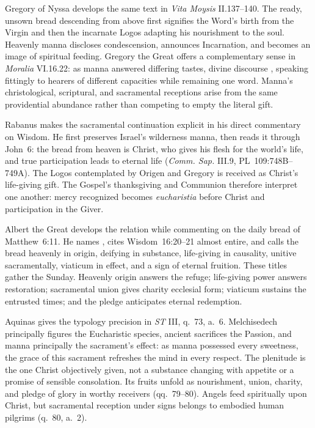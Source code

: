 Gregory of Nyssa develops the same text in \emph{Vita Moysis} II.137--140. The
ready, unsown bread descending from above first signifies the Word's birth from
the Virgin and then the incarnate Logos adapting his nourishment to the soul.
Heavenly manna discloses condescension, announces Incarnation, and becomes an
image of spiritual feeding. Gregory the Great offers a complementary sense in
\emph{Moralia} VI.16.22: as manna answered differing tastes, divine discourse
, speaking fittingly to hearers of
different capacities while remaining one word. Manna's christological,
scriptural, and sacramental receptions arise from the same providential
abundance rather than competing to empty the literal gift.

Rabanus makes the sacramental continuation explicit in his direct commentary
on Wisdom. He first preserves Israel's wilderness manna, then reads it through
John~6: the bread from heaven is Christ, who gives his flesh for the world's
life, and true participation leads to eternal life (\emph{Comm. Sap.} III.9,
PL~109:748B--749A). The Logos contemplated by Origen and Gregory is received as
Christ's life-giving gift. The Gospel's thanksgiving and Communion therefore
interpret one another: mercy recognized becomes \emph{eucharistia} before
Christ and participation in the Giver.

Albert the Great develops the relation while commenting on the daily bread of
Matthew~6:11. He names , cites Wisdom~16:20--21 almost
entire, and calls the bread heavenly in origin, deifying in substance,
life-giving in causality, unitive sacramentally, viaticum in effect, and a sign
of eternal fruition. These titles gather the Sunday. Heavenly origin answers
the refuge; life-giving power answers restoration; sacramental union gives
charity ecclesial form; viaticum sustains the entrusted times; and the pledge
anticipates eternal redemption.

Aquinas gives the typology precision in \emph{ST} III, q.~73, a.~6.
Melchisedech principally figures the Eucharistic species, ancient sacrifices
the Passion, and manna principally the sacrament's effect: as manna possessed
every sweetness, the grace of this sacrament refreshes the mind in every
respect. The plenitude is the one Christ objectively given, not a substance
changing with appetite or a promise of sensible consolation. Its fruits unfold
as nourishment, union, charity, and pledge of glory in worthy receivers
(qq.~79--80). Angels feed spiritually upon Christ, but sacramental reception
under signs belongs to embodied human pilgrims (q.~80, a.~2).


